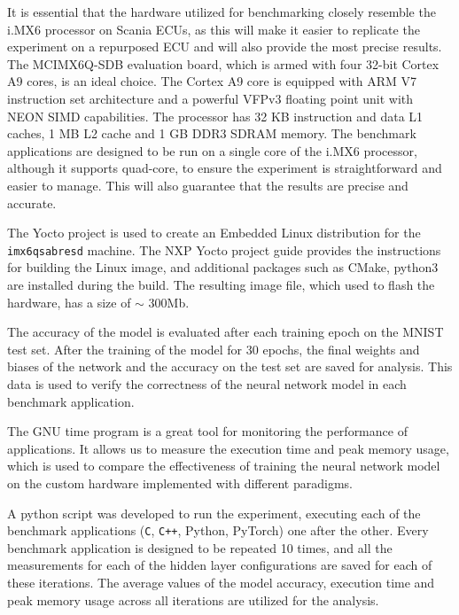 It is essential that the hardware utilized for benchmarking closely resemble the i.MX6 processor on Scania ECUs, as this will make it easier to replicate the experiment on a repurposed ECU and will also provide the most precise results. The MCIMX6Q-SDB evaluation board, which is armed with four 32-bit Cortex A9 cores, is an ideal choice. The Cortex A9 core is equipped with ARM V7 instruction set architecture and a powerful VFPv3 floating point unit with NEON SIMD capabilities. The processor has 32 KB instruction and data L1 caches, 1 MB L2 cache and 1 GB DDR3 SDRAM memory. The benchmark applications are designed to be run on a single core of the i.MX6 processor, although it supports quad-core, to ensure the experiment is straightforward and easier to manage. This will also guarantee that the results are precise and accurate.

The Yocto project is used to create an Embedded Linux distribution for the \texttt{imx6qsabresd} machine. The NXP Yocto project guide \cite{nxp-yocto} provides the instructions for building the Linux image, and additional packages such as CMake, python3 are installed during the build. The resulting image file, which used to flash the hardware, has a size of $\sim$ 300Mb.

The accuracy of the model is evaluated after each training epoch on the MNIST test set. After the training of the model for 30 epochs, the final weights and biases of the network and the accuracy on the test set are saved for analysis. This data is used to verify the correctness of the neural network model in each benchmark application.

The GNU time program is a great tool for monitoring the performance of applications. It allows us to measure the execution time and peak memory usage, which is used to compare the effectiveness of training the neural network model on the custom hardware implemented with different paradigms.

A python script was developed to run the experiment, executing each of the benchmark applications (\texttt{C}, \texttt{C++}, Python, PyTorch) one after the other. Every benchmark application is designed to be repeated 10 times, and all the measurements for each of the hidden layer configurations are saved for each of these iterations. The average values of the model accuracy, execution time and peak memory usage across all iterations are utilized for the analysis.


